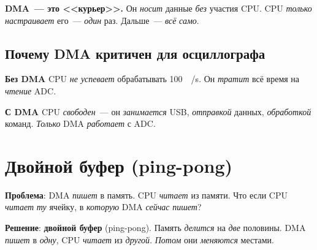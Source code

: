 \begin{keybox}
\textbf{DMA~--- это <<курьер>>.} Он \emph{носит} данные
\emph{без} участия CPU. CPU \emph{только} \emph{настраивает}
его~--- \emph{один} раз. Дальше~--- \emph{всё} \emph{само}.
\end{keybox}

\subsection{Почему DMA критичен для осциллографа}

\textbf{Без DMA} CPU \emph{не успевает} обрабатывать
\SI{100}{\kilo\sample/\second}. Он \emph{тратит} всё
время на \emph{чтение} ADC.

\textbf{С DMA} CPU \emph{свободен}~--- он \emph{занимается}
USB, \emph{отправкой} данных, \emph{обработкой} команд.
\emph{Только} DMA \emph{работает} с ADC.

\section{Двойной буфер (ping-pong)}
\label{sec:dma-pingpong}

\textbf{Проблема}: DMA \emph{пишет} в память. CPU \emph{читает}
из памяти. Что если CPU \emph{читает} \emph{ту} ячейку,
в \emph{которую} DMA \emph{сейчас} \emph{пишет}?

\textbf{Решение}: \textbf{двойной буфер} (ping-pong). Память
\emph{делится} на \emph{две} половины. DMA \emph{пишет}
в \emph{одну}, CPU \emph{читает} из \emph{другой}. \emph{Потом}
они \emph{меняются} местами.




